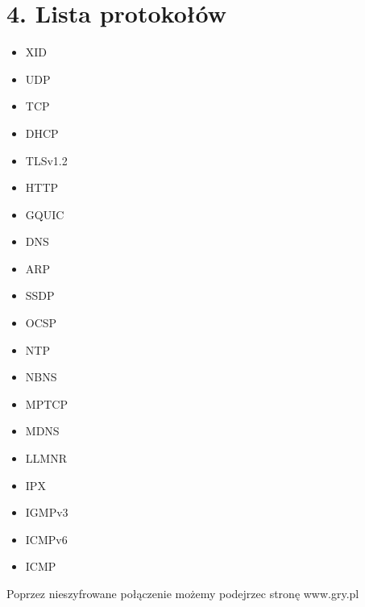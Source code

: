 \documentclass[12pt, a4paper]{article}
\begin{document}
\section*{4. Lista protokołów}
\begin{multicols}{2}
    \begin{itemize}
        \item XID
        \item UDP
        \item TCP
        \item DHCP
        \item TLSv1.2
        \item HTTP
        \item GQUIC
        \item DNS
        \item ARP
        \item SSDP
        \item OCSP
        \item NTP
        \item NBNS
        \item MPTCP
        \item MDNS
        \item LLMNR
        \item IPX
        \item IGMPv3
        \item ICMPv6
        \item ICMP
    \end{itemize}
\end{multicols}
\vspace{5mm}
Poprzez nieszyfrowane połączenie możemy podejrzec stronę www.gry.pl
\clearpage
\end{document}
